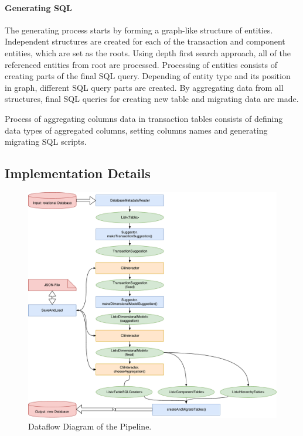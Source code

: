 \paragraph{Generating SQL}

The generating process starts by forming a graph-like structure of entities.
Independent structures are created for each of the transaction and component entities, which are set as the roots.
Using depth first search approach, all of the referenced entities from root are processed.
Processing of entities consists of creating parts of the final SQL query.
Depending of entity type and its position in graph, different SQL query parts are created.
By aggregating data from all structures, final SQL queries for creating new table and migrating data are made.
\par
Process of aggregating columns data in transaction tables consists of defining data types of aggregated columns, setting columns names and generating migrating SQL scripts.  

\subsection{Implementation Details}

\begin{figure}
  \centering
  \includegraphics[width=\linewidth]{images/dataFlowDiagram}
  \caption{Dataflow Diagram of the Pipeline.}
  \label{fig:dataflowDiagram}
\end{figure}

